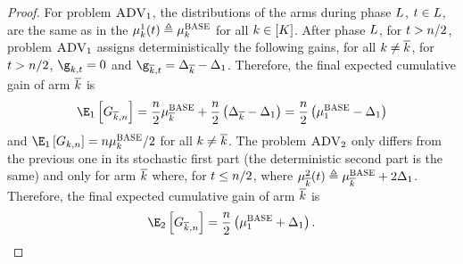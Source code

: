 \begin{proof}
	
	For problem $\textsc{ADV}_1$, the distributions of 
	the arms during phase $L$, $t\in L$, 
	are the same as in the \basePro{} 
	$\mu^{1}_{k}(t) \triangleq \mu^{\textsc{BASE}}_{k} $ 
	for all $k\in [K]$.
	After  phase $L$, for $t>  n/2$, 
	problem $\textsc{ADV}_1$ assigns deterministically the following gains,
	 for all $k\neq \overline k$, for $t>  n/2$, $\gainVector_{k,t}=0$ 
	 and $\gainVector_{\refarm,t}=\gap_{\refarm}-\gap_1$.
	Therefore, the final expected cumulative gain of arm 
	 $\overline k$ is  \[\Exp_1\left[\cumulGain_{\refarm,n}\right]
	= \frac{\timeHorizon}{2}\mean^{\basePro}_{\refarm}+
	\frac{\timeHorizon}{2}\left(\gap_{\refarm}-\gap_1\right)=
	\frac{\timeHorizon}{2}\left(\mean^{\basePro}_1-\gap_1\right)\] and $\Exp_1\left[\cumulGain_{k,n}\right]= 
	\timeHorizon\mean^{\basePro}_k/2$ for all $k\neq\overline k$.
	The problem $\textsc{ADV}_2$ only differs from the 
	previous one in its stochastic first part 
	(the deterministic second part is the same) and only for arm $\overline k$ where, 
	for $t\leq  n/2$, where $\mu_{\overline k}^{2}(t)\triangleq\mu_{\overline k}^{\textsc{BASE}}+2\Delta_1$.
	Therefore, the final expected cumulative gain of arm $\overline k$  
	is  \[\Exp_2\left[\cumulGain_{\refarm,n}\right]
	= \frac{\timeHorizon}{2}\left(\mean^{\basePro}_1+\gap_1\right).\] 
	
	
	

\end{proof}
